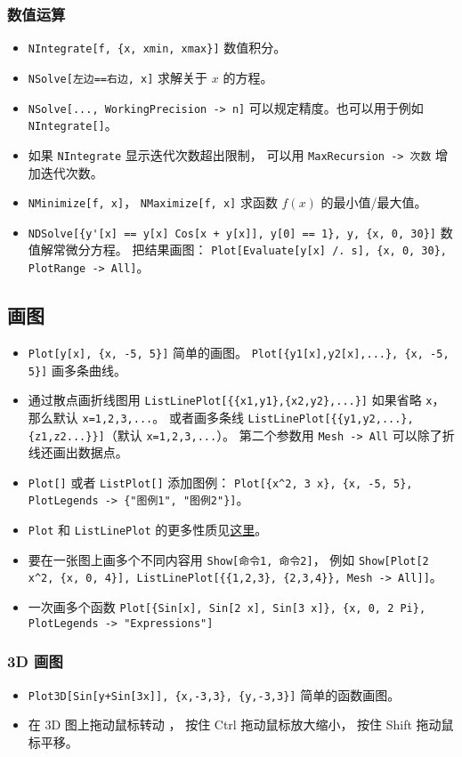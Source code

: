 \subsubsection{数值运算}
\begin{itemize}
\item \verb|NIntegrate[f, {x, xmin, xmax}]| 数值积分。
\item \verb|NSolve[左边==右边, x]| 求解关于 $x$ 的方程。
\item \verb|NSolve[..., WorkingPrecision -> n]| 可以规定精度。也可以用于例如 \verb|NIntegrate[]|。
\item 如果 \verb|NIntegrate| 显示迭代次数超出限制， 可以用 \verb|MaxRecursion -> 次数| 增加迭代次数。
\item \verb|NMinimize[f, x]|， \verb|NMaximize[f, x]| 求函数 $f(x)$ 的最小值/最大值。
\item \verb|NDSolve[{y'[x] == y[x] Cos[x + y[x]], y[0] == 1}, y, {x, 0, 30}]| 数值解常微分方程。 把结果画图： \verb|Plot[Evaluate[y[x] /. s], {x, 0, 30}, PlotRange -> All]|。
\end{itemize}

\subsection{画图}
\begin{itemize}
\item \verb|Plot[y[x], {x, -5, 5}]| 简单的画图。 \verb|Plot[{y1[x],y2[x],...}, {x, -5, 5}]| 画多条曲线。
\item 通过散点画折线图用 \verb|ListLinePlot[{{x1,y1},{x2,y2},...}]| 如果省略 \verb|x|， 那么默认 \verb|x=1,2,3,...|。 或者画多条线 \verb|ListLinePlot[{{y1,y2,...},{z1,z2...}}]|（默认 \verb|x=1,2,3,...|）。 第二个参数用 \verb|Mesh -> All| 可以除了折线还画出数据点。
\item \verb|Plot[]| 或者 \verb|ListPlot[]| 添加图例： \verb|Plot[{x^2, 3 x}, {x, -5, 5}, PlotLegends -> {"图例1", "图例2"}]|。
\item \verb|Plot| 和 \verb|ListLinePlot| 的更多性质见\href{https://reference.wolfram.com/language/ref/Plot.html}{这里}。
\item 要在一张图上画多个不同内容用 \verb|Show[命令1, 命令2]|， 例如 \verb|Show[Plot[2 x^2, {x, 0, 4}], ListLinePlot[{{1,2,3}, {2,3,4}}, Mesh -> All]]|。
\item 一次画多个函数 \verb`Plot[{Sin[x], Sin[2 x], Sin[3 x]}, {x, 0, 2 Pi},  PlotLegends -> "Expressions"]`
\end{itemize}

\subsubsection{3D 画图}
\begin{itemize}
\item \verb|Plot3D[Sin[y+Sin[3x]], {x,-3,3}, {y,-3,3}]| 简单的函数画图。
\item 在 3D 图上拖动鼠标转动 ， 按住 Ctrl 拖动鼠标放大缩小， 按住 Shift 拖动鼠标平移。
\end{itemize}

